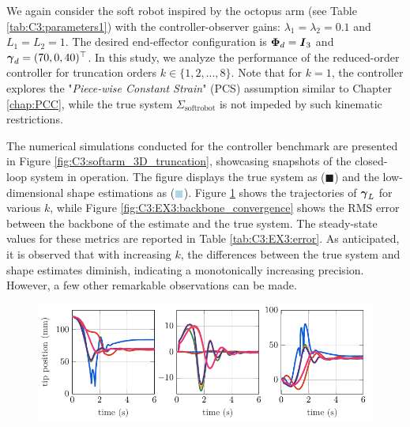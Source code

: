 %
We again consider the soft robot inspired by the octopus arm (see Table \ref{tab:C3:parameters1}) with the controller-observer gains: $\lambda_1 = \lambda_2 = 0.1$ and $L_1 = L_2 = 1$. The desired end-effector configuration is ${\boldsymbol{\Phi}}_d = {\boldsymbol{I}}_3$ and ${\boldsymbol{\gamma}}_d = (70, 0, 40)^\top$. In this study, we analyze the performance of the reduced-order controller for truncation orders $k \in \{1,2,...,8\}$. Note that for $k=1$, the controller explores the "\emph{Piece-wise Constant Strain}" (PCS) assumption similar to Chapter \ref{chap:PCC}, while the true system $\Sigma_{\textrm{softrobot}}$ is not impeded by such kinematic restrictions. %

The numerical simulations conducted for the controller benchmark are presented in Figure \ref{fig:C3:softarm_3D_truncation}, showcasing snapshots of the closed-loop system in operation. The figure displays the true system as (\textcolor{matinfil!50}{$\blacksquare$}) and the low-dimensional shape estimations as (\textcolor{lightblue}{$\blacksquare$}). Figure \ref{fig:C3:EX3:gamma_order} shows the trajectories of ${\boldsymbol{\gamma}}_L$ for various $k$, while Figure \ref{fig:C3:EX3:backbone_convergence} shows the RMS error between the backbone of the estimate and the true system. The steady-state values for these metrics are reported in Table \ref{tab:C3:EX3:error}. As anticipated, it is observed that with increasing $k$, the differences between the true system and shape estimates diminish, indicating a monotonically increasing precision. However, a few other remarkable observations can be made.

\begin{figure}[!t]
\centering
\vspace{-1mm}
% 
\includegraphics*[width=\textwidth]{./pdf/thesis-figure-5-14.pdf}
\vspace{-5mm}
\caption{\small {}}
\vspace{-0.2cm}
\label{fig:C3:EX3:gamma_order}
\end{figure}


